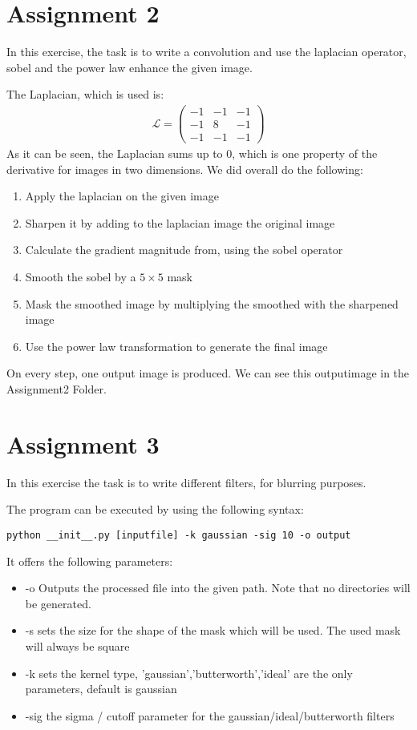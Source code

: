 \section{Assignment 2}

In this exercise, the task is to write a convolution and use the laplacian operator, sobel and the power law enhance the given image.

The Laplacian, which is used is:
\begin{gather*}
\mathcal{L} = \left( \begin{array}{ccc}
-1 & -1 & -1\\
-1 &  8 & -1\\
-1 & -1 & -1
\end{array} \right)
\end{gather*}
As it can be seen, the Laplacian sums up to 0, which is one property of the derivative for images in two dimensions.
We did overall do the following:
\begin{enumerate}
\item Apply the laplacian on the given image
\item Sharpen it by adding to the laplacian image the original image
\item Calculate the gradient magnitude from, using the sobel operator
\item Smooth the sobel by a $5 \times 5$ mask
\item Mask the smoothed image by multiplying the smoothed with the sharpened image
\item Use the power law transformation to generate the final image
\end{enumerate}
On every step, one output image is produced. We can see this outputimage in the Assignment2 Folder.


\section{Assignment 3}
In this exercise the task is to write different filters, for blurring purposes.

The program can be executed by using the following syntax:
\begin{verbatim}
python __init__.py [inputfile] -k gaussian -sig 10 -o output
\end{verbatim}
It offers the following parameters:

\begin{itemize}
\item -o Outputs the processed file into the given path. Note that no directories will be generated.
\item -s sets the size for the shape of the mask which will be used. The used mask will always be square
\item -k sets the kernel type, 'gaussian','butterworth','ideal' are the only parameters, default is gaussian
\item -sig the sigma / cutoff parameter for the gaussian/ideal/butterworth filters
\end{itemize}

